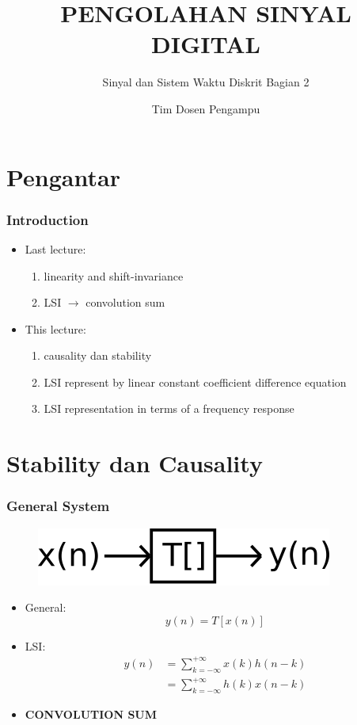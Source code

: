 \documentclass[pdflatex,compress]{beamer}
\title{PENGOLAHAN SINYAL DIGITAL}
\subtitle{Sinyal dan Sistem Waktu Diskrit Bagian 2}
\author{Tim Dosen Pengampu}
\begin{document}
\maketitle

\section{Pengantar}

\begin{frame}
	\frametitle{Introduction}
	\begin{itemize}
		\item Last lecture:
		\begin{enumerate}
			\item linearity and shift-invariance
			\item LSI $\rightarrow$ convolution sum	
		\end{enumerate}
		\item This lecture:
		\begin{enumerate}
			\item causality dan stability
			\item LSI represent by linear constant coefficient difference equation
			\item LSI representation in terms of a frequency response
		\end{enumerate}
	\end{itemize}
\end{frame}

\section{Stability dan Causality}

\begin{frame}
	\frametitle{General System}
	\begin{figure}
		\centering
		\includegraphics[width=0.3\linewidth]{img/img01}
	\end{figure}
	\begin{itemize}
		\item General: \[ y(n) = T[x(n)] \]
		\item LSI: 
		\begin{align*}
			y(n) &= \sum_{k=-\infty}^{+\infty} x(k)h(n-k) \\
				 &= \sum_{k=-\infty}^{+\infty} h(k)x(n-k)
		\end{align*}
		\item \textbf{CONVOLUTION SUM}
	\end{itemize}
\end{frame}
\end{document}
